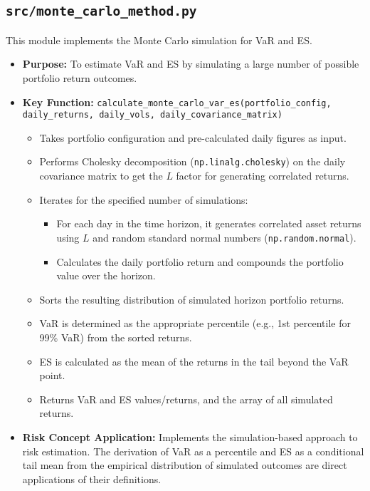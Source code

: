 \documentclass[11pt,a4paper]{article}
\begin{document}
\subsection{\texttt{src/monte\_carlo\_method.py}}
This module implements the Monte Carlo simulation for VaR and ES.
\begin{itemize}
    \item \textbf{Purpose:} To estimate VaR and ES by simulating a large number of possible portfolio return outcomes.
    \item \textbf{Key Function:} \texttt{calculate\_monte\_carlo\_var\_es(portfolio\_config, daily\_returns, daily\_vols, daily\_covariance\_matrix)}
        \begin{itemize}
            \item Takes portfolio configuration and pre-calculated daily figures as input.
            \item Performs Cholesky decomposition (\texttt{np.linalg.cholesky}) on the daily covariance matrix to get the $L$ factor for generating correlated returns.
            \item Iterates for the specified number of simulations:
                \begin{itemize}
                    \item For each day in the time horizon, it generates correlated asset returns using $L$ and random standard normal numbers (\texttt{np.random.normal}).
                    \item Calculates the daily portfolio return and compounds the portfolio value over the horizon.
                \end{itemize}
            \item Sorts the resulting distribution of simulated horizon portfolio returns.
            \item VaR is determined as the appropriate percentile (e.g., 1st percentile for 99\% VaR) from the sorted returns.
            \item ES is calculated as the mean of the returns in the tail beyond the VaR point.
            \item Returns VaR and ES values/returns, and the array of all simulated returns.
        \end{itemize}
    \item \textbf{Risk Concept Application:} Implements the simulation-based approach to risk estimation. The derivation of VaR as a percentile and ES as a conditional tail mean from the empirical distribution of simulated outcomes are direct applications of their definitions.
\end{itemize}
\end{document}

